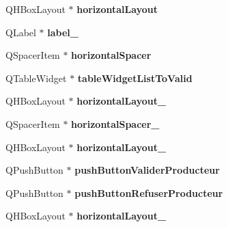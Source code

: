 \begin{DoxyCompactItemize}
\item 
\hypertarget{classUi__MainWindow2_a4416ac199c381bb03bf7b682a9568869}{Q\-H\-Box\-Layout $\ast$ {\bfseries horizontal\-Layout}}\label{classUi__MainWindow2_a4416ac199c381bb03bf7b682a9568869}

\item 
\hypertarget{classUi__MainWindow2_ab44b82a5239521f98dfdc17886c53d00}{Q\-Label $\ast$ {\bfseries label\-\_}}\label{classUi__MainWindow2_ab44b82a5239521f98dfdc17886c53d00}

\item 
\hypertarget{classUi__MainWindow2_a197dca6154e9f59d6d180aad7e8bebde}{Q\-Spacer\-Item $\ast$ {\bfseries horizontal\-Spacer}}\label{classUi__MainWindow2_a197dca6154e9f59d6d180aad7e8bebde}

\item 
\hypertarget{classUi__MainWindow2_ad6a8a7ff0a6f182aa0185775327d22cd}{Q\-Table\-Widget $\ast$ {\bfseries table\-Widget\-List\-To\-Valid}}\label{classUi__MainWindow2_ad6a8a7ff0a6f182aa0185775327d22cd}

\item 
\hypertarget{classUi__MainWindow2_a55777f7f323aa03bc2d2a19782226a8b}{Q\-H\-Box\-Layout $\ast$ {\bfseries horizontal\-Layout\-\_}}\label{classUi__MainWindow2_a55777f7f323aa03bc2d2a19782226a8b}

\item 
\hypertarget{classUi__MainWindow2_a24ff01e8e92e5e2b34d3ee4589777706}{Q\-Spacer\-Item $\ast$ {\bfseries horizontal\-Spacer\-\_}}\label{classUi__MainWindow2_a24ff01e8e92e5e2b34d3ee4589777706}

\item 
\hypertarget{classUi__MainWindow2_a18c2f495c5e4a45cb91cfd6fcd35e12a}{Q\-H\-Box\-Layout $\ast$ {\bfseries horizontal\-Layout\-\_}}\label{classUi__MainWindow2_a18c2f495c5e4a45cb91cfd6fcd35e12a}

\item 
\hypertarget{classUi__MainWindow2_ad9a1968ab6fa96f39c840e8e08a32aba}{Q\-Push\-Button $\ast$ {\bfseries push\-Button\-Valider\-Producteur}}\label{classUi__MainWindow2_ad9a1968ab6fa96f39c840e8e08a32aba}

\item 
\hypertarget{classUi__MainWindow2_a5b55a7db95e5e13231cbc21d46bb7a90}{Q\-Push\-Button $\ast$ {\bfseries push\-Button\-Refuser\-Producteur}}\label{classUi__MainWindow2_a5b55a7db95e5e13231cbc21d46bb7a90}

\item 
\hypertarget{classUi__MainWindow2_a556815b1c26ed4f84070f8fcc34ba7e2}{Q\-H\-Box\-Layout $\ast$ {\bfseries horizontal\-Layout\-\_}}\label{classUi__MainWindow2_a556815b1c26ed4f84070f8fcc34ba7e2}


\end{DoxyCompactItemize}

